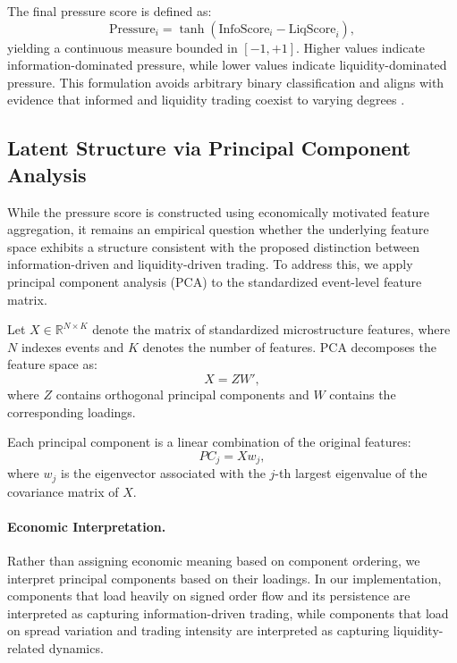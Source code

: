 The final pressure score is defined as:
\begin{equation}
\text{Pressure}_i = \tanh(\text{InfoScore}_i - \text{LiqScore}_i),
\end{equation}
yielding a continuous measure bounded in $[-1, +1]$. Higher values indicate
information-dominated pressure, while lower values indicate liquidity-dominated
pressure. This formulation avoids arbitrary binary classification and aligns with
evidence that informed and liquidity trading coexist to varying degrees
\citep{Easley2012}.

\subsection{Latent Structure via Principal Component Analysis}

While the pressure score is constructed using economically motivated feature aggregation, it remains an empirical question whether the underlying feature space exhibits a structure consistent with the proposed distinction between information-driven and liquidity-driven trading. To address this, we apply principal component analysis (PCA) to the standardized event-level feature matrix.

Let $X \in \mathbb{R}^{N \times K}$ denote the matrix of standardized microstructure features, where $N$ indexes events and $K$ denotes the number of features. PCA decomposes the feature space as:
\begin{equation}
X = Z W',
\end{equation}
where $Z$ contains orthogonal principal components and $W$ contains the corresponding loadings.

Each principal component is a linear combination of the original features:
\begin{equation}
PC_j = X w_j,
\end{equation}
where $w_j$ is the eigenvector associated with the $j$-th largest eigenvalue of the covariance matrix of $X$.

\paragraph{Economic Interpretation.}
Rather than assigning economic meaning based on component ordering, we interpret principal components based on their loadings. In our implementation, components that load heavily on signed order flow and its persistence are interpreted as capturing information-driven trading, while components that load on spread variation and trading intensity are interpreted as capturing liquidity-related dynamics.

